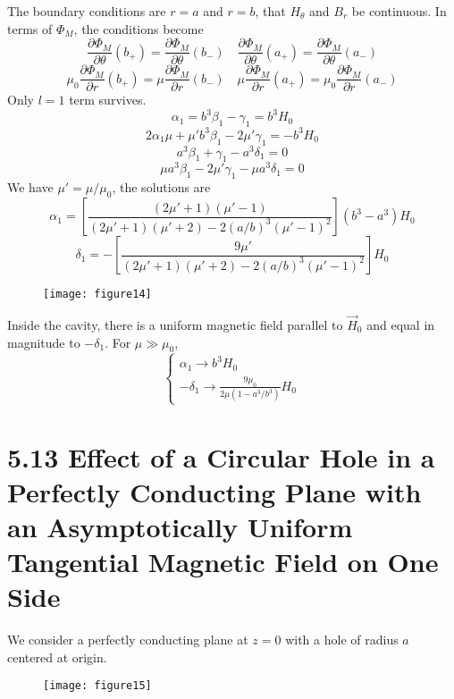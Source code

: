 \documentclass{article}
\begin{document}
	The boundary conditions are $r=a$ and $r=b$, that $H_\theta$ and $B_r$ be continuous.
	In terms of $\Phi_M$, the conditions become
	$$ \frac{\partial \Phi_M}{\partial \theta} (b_+) = \frac{\partial \Phi_M}{\partial \theta} (b_-) \quad \frac{\partial \Phi_M}{\partial \theta} (a_+) = \frac{\partial \Phi_M}{\partial \theta} (a_-) $$
	$$ \mu_0 \frac{\partial \Phi_M}{\partial r} (b_+) = \mu \frac{\partial \Phi_M}{\partial r} (b_-) \quad \mu \frac{\partial \Phi_M}{\partial r} (a_+) = \mu_0 \frac{\partial \Phi_M}{\partial r} (a_-) $$
	Only $l=1$ term survives.
	$$ \alpha_1 = b^3 \beta_1 - \gamma_1 = b^3 H_0 $$
	$$ 2\alpha_1 \mu + \mu' b^3 \beta_1 - 2\mu' \gamma_1 = -b^3 H_0 $$
	$$ a^3 \beta_1 + \gamma_1 - a^3 \delta_1 = 0 $$
	$$ \mu a^3 \beta_1 - 2\mu' \gamma_1 - \mu a^3 \delta_1 = 0 $$
	We have $\mu' = \mu / \mu_0$, the solutions are
	$$ \alpha_1 = \left[ \frac{(2\mu'+1)(\mu'-1)}{(2\mu'+1)(\mu'+2) - 2(a/b)^3(\mu'-1)^2} \right] (b^3 - a^3) H_0 $$
	$$ \delta_1 = - \left[ \frac{9\mu'}{(2\mu'+1)(\mu'+2) - 2(a/b)^3(\mu'-1)^2} \right] H_0 $$
	
	
	\begin{figure}[h]
		\centering
		\texttt{[image: figure14]}
		\caption{}
		\label{fig:figure14}
	\end{figure}
	
	Inside the cavity, there is a uniform magnetic field parallel to $\vec{H}_0$ and equal in magnitude to $-\delta_1$.
	For $\mu \gg \mu_0$,
	$$ \left\{ \begin{array}{l} \alpha_1 \to b^3 H_0 \\ -\delta_1 \to \frac{9\mu_0}{2\mu(1-a^3/b^3)} H_0 \end{array} \right. $$
	
	\section*{5.13 Effect of a Circular Hole in a Perfectly Conducting Plane with an Asymptotically Uniform Tangential Magnetic Field on One Side}
	We consider a perfectly conducting plane at $z=0$ with a hole of radius $a$ centered at origin. 
	
	\begin{figure}[h]
		\centering
		\texttt{[image: figure15]}
		\caption{}
		\label{fig:figure15}
	\end{figure}
	
\end{document}
